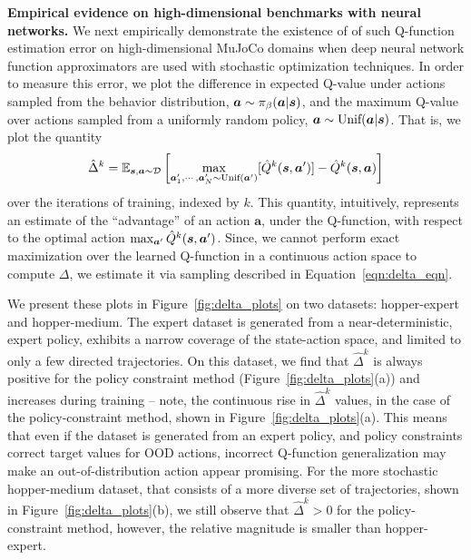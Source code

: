 \textbf{Empirical evidence on high-dimensional benchmarks with neural networks.}  
We next empirically demonstrate the existence of of such Q-function estimation error on high-dimensional MuJoCo domains when deep neural network function approximators are used with stochastic optimization techniques. In order to measure this error, we plot the difference in expected Q-value under actions sampled from the behavior distribution, $\boldsymbol{a} \sim {\pi_\beta}(\boldsymbol{a}|\boldsymbol{s})$, and the maximum Q-value over actions sampled from a uniformly random policy, $\boldsymbol{a} \sim \text{Unif}(\boldsymbol{a}|\boldsymbol{s})$. That is, we plot the quantity
\begin{equation}
\label{eqn:delta_eqn}
    \hat{\Delta}^k = \mathbb{E}_{\boldsymbol{s}, \boldsymbol{a} \sim \mathcal{D}}\left[\max_{\boldsymbol{a}'_1, \cdots, \boldsymbol{a}'_N \sim \text{Unif}(\boldsymbol{a}')}[\hat{Q}^k(\boldsymbol{s}, \boldsymbol{a}')]- \hat{Q}^k(\boldsymbol{s}, \boldsymbol{a})\right]
\end{equation}
over the iterations of training, indexed by $k$. This quantity, intuitively, represents an estimate of the ``advantage'' of an action $\mathbf{a}$, under the Q-function, with respect to the optimal action $\max_{\boldsymbol{a}'} \hat{Q}^k(\boldsymbol{s}, \boldsymbol{a}')$. Since, we cannot perform exact maximization over the learned Q-function in a continuous action space to compute $\Delta$, we estimate it via sampling described in Equation~\ref{eqn:delta_eqn}.

We present these plots in Figure~\ref{fig:delta_plots} on two datasets: hopper-expert and hopper-medium. The expert dataset is generated from a near-deterministic, expert policy, exhibits a narrow coverage of the state-action space, and limited to only a few directed trajectories. On this dataset, we find that $\hat{\Delta}^k$ is always positive for the policy constraint method (Figure~\ref{fig:delta_plots}(a)) and increases during training -- note, the continuous rise in $\hat{\Delta}^k$ values, in the case of the policy-constraint method, shown in Figure~\ref{fig:delta_plots}(a). This means that even if the dataset is generated from an expert policy, and policy constraints correct target values for OOD actions,
incorrect Q-function generalization may make an out-of-distribution action appear promising. For the more stochastic hopper-medium dataset, that consists of a more diverse set of trajectories, shown in Figure~\ref{fig:delta_plots}(b), we still observe that $\hat{\Delta}^k > 0$ for the policy-constraint method, however, the relative magnitude is smaller than hopper-expert.

